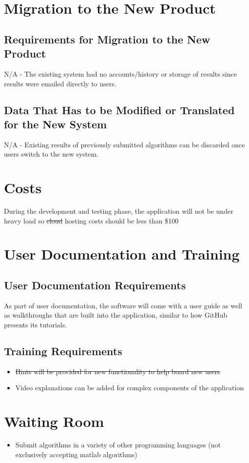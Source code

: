 \documentclass[12pt]{article}
\begin{document}
\section{Migration to the New Product}
\subsection{Requirements for Migration to the New Product}
N/A - The existing system had no accounts/history or storage of results since results were emailed directly to users.

\subsection{Data That Has to be Modified or Translated for the New System}
N/A - Existing results of previously submitted algorithms can be discarded once users switch to the new system.

\section{Costs}
    During the development and testing phase, the application will not be under heavy load so \sout{cloud} hosting costs should be less than \$100

\section{User Documentation and Training}
\subsection{User Documentation Requirements}
As part of user documentation, the software will come with a user guide as well as walkthroughs that are built into the application, similar to how GitHub presents its tutorials.

\subsection{Training Requirements}
\begin{itemize}
    \item \sout{Hints will be provided for new functionality to help board new users}
    \item Video explanations can be added for complex components of the application
\end{itemize}

\section{Waiting Room}
\begin{itemize}
    \item Submit algorithms in a variety of other programming languages (not exclusively accepting matlab algorithms)
\end{itemize}
\end{document}
